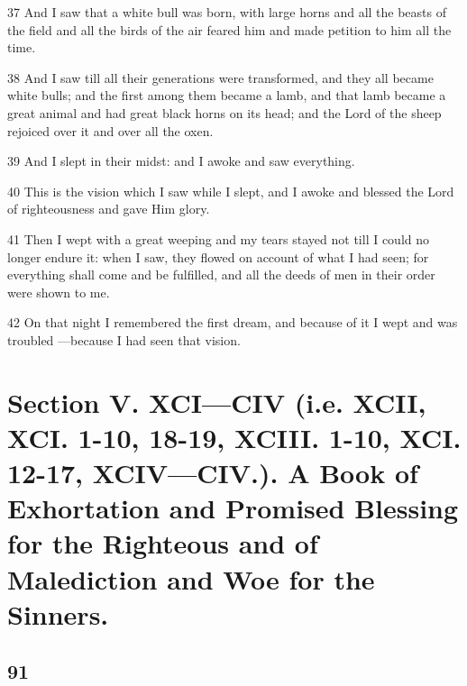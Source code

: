 \par 37 And I saw that a white bull was born, with large horns and all the beasts of the field and all the birds of the air feared him and made petition to him all the time.
\par 38 And I saw till all their generations were transformed, and they all became white bulls; and the first among them became a lamb, and that lamb became a great animal and had great black horns on its head; and the Lord of the sheep rejoiced over it and over all the oxen.
\par 39 And I slept in their midst: and I awoke and saw everything.
\par 40 This is the vision which I saw while I slept, and I awoke and blessed the Lord of righteousness and gave Him glory.
\par 41 Then I wept with a great weeping and my tears stayed not till I could no longer endure it: when I saw, they flowed on account of what I had seen; for everything shall come and be fulfilled, and all the deeds of men in their order were shown to me.
\par 42 On that night I remembered the first dream, and because of it I wept and was troubled —because I had seen that vision.

\part {Section V. XCI—CIV (i.e. XCII, XCI. 1-10, 18-19, XCIII. 1-10, XCI. 12-17, XCIV—CIV.). A Book of Exhortation and Promised Blessing for the Righteous and of Malediction and Woe for the Sinners.}

\chapter{91}

